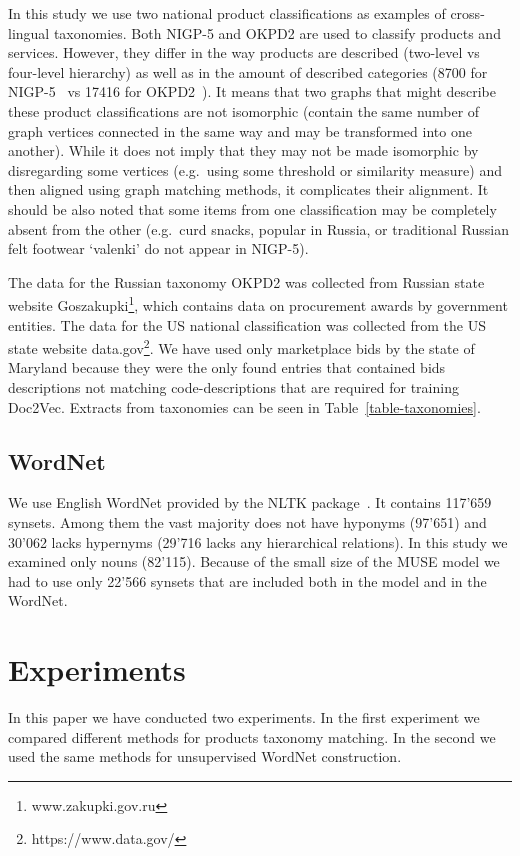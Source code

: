 \documentclass[11pt,a4paper]{article}
\begin{document}
In this study we use two national product classifications as examples of cross-lingual taxonomies.
Both NIGP-5 and OKPD2 are used to classify products and services. However, they differ in the way products are described (two-level vs four-level hierarchy) as well as in the amount of described categories (8700 for NIGP-5~\cite{wiki-nigp} vs 17416 for OKPD2~\cite{wiki-okpd}). It means that two graphs that might describe these product classifications are not isomorphic (contain the same number of graph vertices connected in the same way and may be transformed into one another).  While it does not imply that they may not be made isomorphic by disregarding some vertices (e.g.\ using some threshold or similarity measure) and then aligned using graph matching methods, it complicates their alignment. It should be also noted that some items from one classification may be completely absent from the other (e.g.\ curd snacks, popular in Russia, or traditional Russian felt footwear `valenki' do not appear in NIGP-5).

The data for the Russian taxonomy OKPD2 was collected from Russian state website Goszakupki\footnote{www.zakupki.gov.ru}, which contains data on procurement awards by government entities.
The data for the US national classification was collected from the US state website data.gov\footnote{https://www.data.gov/}. We have used only marketplace bids by the state of Maryland because they were the only found entries that contained bids descriptions not matching code-descriptions that are required for training Doc2Vec. Extracts from taxonomies can be seen in Table~\ref{table-taxonomies}.

\subsection{WordNet}
We use English WordNet provided by the NLTK package~\cite{wordnet,nltk}. It contains 117'659 synsets. Among them the vast majority does not have hyponyms (97'651) and 30'062 lacks hypernyms (29'716 lacks any hierarchical relations). In this study we examined only nouns (82'115). Because of the small size of the MUSE model we had to use only 22'566 synsets that are included both in the model and in the WordNet.
\section{Experiments}
In this paper we have conducted two experiments. In the first experiment we compared different methods for products taxonomy matching. In the second we used the same methods for unsupervised WordNet construction.
\end{document}
